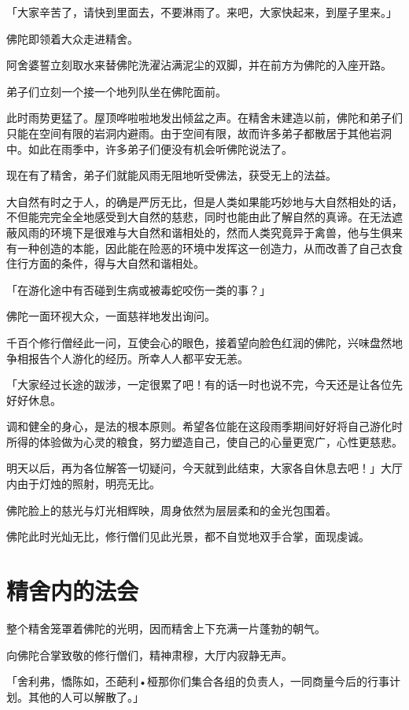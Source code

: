 \documentclass[twoside,openany]{book}
\begin{document}
「大家辛苦了，请快到里面去，不要淋雨了。来吧，大家快起来，到屋子里来。」

佛陀即领着大众走进精舍。

阿舍婆誓立刻取水来替佛陀洗濯沾满泥尘的双脚，并在前方为佛陀的入座开路。

弟子们立刻一个接一个地列队坐在佛陀面前。

此时雨势更猛了。屋顶哗啦啦地发出倾盆之声。在精舍未建造以前，佛陀和弟子们只能在空间有限的岩洞内避雨。由于空间有限，故而许多弟子都散居于其他岩洞中。如此在雨季中，许多弟子们便没有机会听佛陀说法了。

现在有了精舍，弟子们就能风雨无阻地听受佛法，获受无上的法益。

大自然有时之于人，的确是严厉无比，但是人类如果能巧妙地与大自然相处的话，不但能完完全全地感受到大自然的慈悲，同时也能由此了解自然的真谛。在无法遮蔽风雨的环境下是很难与大自然和谐相处的，然而人类究竟异于禽兽，他与生俱来有一种创造的本能，因此能在险恶的环境中发挥这一创造力，从而改善了自己衣食住行方面的条件，得与大自然和谐相处。

「在游化途中有否碰到生病或被毒蛇咬伤一类的事？」

佛陀一面环视大众，一面慈祥地发出询问。

千百个修行僧经此一问，互使会心的眼色，接着望向脸色红润的佛陀，兴味盘然地争相报告个人游化的经历。所幸人人都平安无恙。

「大家经过长途的跋涉，一定很累了吧！有的话一时也说不完，今天还是让各位先好好休息。

调和健全的身心，是法的根本原则。希望各位能在这段雨季期间好好将自己游化时所得的体验做为心灵的粮食，努力塑造自己，使自己的心量更宽广，心性更慈悲。

明天以后，再为各位解答一切疑问，今天就到此结束，大家各自休息去吧！」大厅内由于灯烛的照射，明亮无比。

佛陀脸上的慈光与灯光相辉映，周身依然为层层柔和的金光包围着。

佛陀此时光灿无比，修行僧们见此光景，都不自觉地双手合掌，面现虔诚。

\section{精舍内的法会}\label{sec6.3}

整个精舍笼罩着佛陀的光明，因而精舍上下充满一片蓬勃的朝气。

向佛陀合掌致敬的修行僧们，精神肃穆，大厅内寂静无声。

「舍利弗，憍陈如，丕葩利•桠那你们集合各组的负责人，一同商量今后的行事计划。其他的人可以解散了。」
\end{document}

